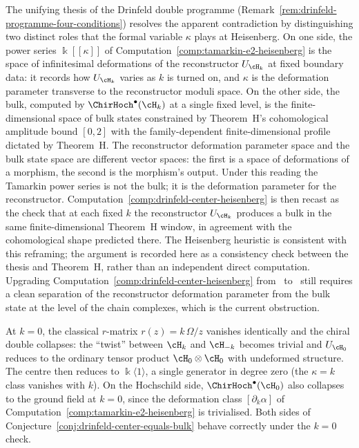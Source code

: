 \begin{remark}
\label{rem:drinfeld-center-heisenberg-thesis-resolution}
The unifying thesis of the Drinfeld double programme
(Remark~\ref{rem:drinfeld-programme-four-conditions}) resolves
the apparent contradiction by distinguishing two distinct roles
that the formal variable $\kappa$ plays at Heisenberg. On one
side, the power series $\Bbbk[[\kappa]]$ of
Computation~\ref{comp:tamarkin-e2-heisenberg} is the space of
infinitesimal deformations of the reconstructor $U_{\cH_k}$ at
fixed boundary data: it records how $U_{\cH_k}$ varies as $k$
is turned on, and $\kappa$ is the deformation parameter
transverse to the reconstructor moduli space. On the other
side, the bulk, computed by $\ChirHoch^\bullet(\cH_k)$ at a
single fixed level, is the finite-dimensional space of bulk
states constrained by Theorem~H's cohomological amplitude
bound $[0,2]$ with the family-dependent finite-dimensional profile
dictated by Theorem~H.
The
reconstructor deformation parameter space and the bulk state
space are different vector spaces: the first is a space of
deformations of a morphism, the second is the morphism's
output. Under this reading the Tamarkin power series is not
the bulk; it is the deformation parameter for the reconstructor.
Computation~\ref{comp:drinfeld-center-heisenberg} is then
recast as the check that at each fixed $k$ the reconstructor
$U_{\cH_k}$ produces a bulk in the same finite-dimensional
Theorem~H window, in agreement with the cohomological shape
predicted there. The Heisenberg heuristic is
consistent with this reframing; the argument is recorded here
as a consistency check between the thesis and Theorem~H,
rather than an independent direct computation. Upgrading
Computation~\ref{comp:drinfeld-center-heisenberg} from
\ClaimStatusHeuristic\ to \ClaimStatusProvedHere\ still
requires a clean separation of the reconstructor deformation
parameter from the bulk state at the level of the chain
complexes, which is the current obstruction.
\end{remark}

\begin{remark}[Sanity check at $k=0$]
\label{rem:drinfeld-center-heisenberg-k-zero}
At $k=0$, the classical $r$-matrix $r(z) = k\,\Omega/z$ vanishes
identically and the chiral double collapses: the
``twist'' between $\cH_k$ and $\cH_{-k}$ becomes trivial and
$U_{\cH_0}$ reduces to the ordinary tensor product
$\cH_0 \otimes \cH_0$ with undeformed structure. The centre then
reduces to $\Bbbk\langle 1\rangle$, a single generator in degree zero
(the $\kappa = k$ class vanishes with $k$). On the Hochschild side,
$\ChirHoch^\bullet(\cH_0)$ also collapses to the ground field at
$k=0$, since the deformation class $[\partial_k\alpha]$ of
Computation~\textup{\ref{comp:tamarkin-e2-heisenberg}} is trivialised.
Both sides of
Conjecture~\textup{\ref{conj:drinfeld-center-equals-bulk}} behave
correctly under the $k=0$ check.
\end{remark}

